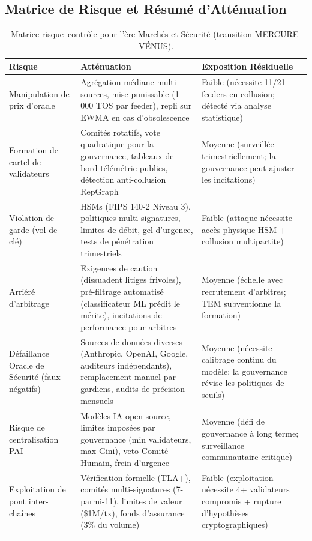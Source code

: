 \documentclass[11pt]{article}
\begin{document}
\subsection{Matrice de Risque et Résumé d'Atténuation}
\begin{longtable}{@{}p{}p{}p{}@{}}
\toprule
\textbf{Risque} & \textbf{Atténuation} & \textbf{Exposition Résiduelle} \\\midrule
Manipulation de prix d'oracle & Agrégation médiane multi-sources, mise punissable (1 000 TOS par feeder), repli sur EWMA en cas d'obsolescence & Faible (nécessite 11/21 feeders en collusion; détecté via analyse statistique) \\
Formation de cartel de validateurs & Comités rotatifs, vote quadratique pour la gouvernance, tableaux de bord télémétrie publics, détection anti-collusion RepGraph & Moyenne (surveillée trimestriellement; la gouvernance peut ajuster les incitations) \\
Violation de garde (vol de clé) & HSMs (FIPS 140-2 Niveau 3), politiques multi-signatures, limites de débit, gel d'urgence, tests de pénétration trimestriels & Faible (attaque nécessite accès physique HSM + collusion multipartite) \\
Arriéré d'arbitrage & Exigences de caution (dissuadent litiges frivoles), pré-filtrage automatisé (classificateur ML prédit le mérite), incitations de performance pour arbitres & Moyenne (échelle avec recrutement d'arbitres; TEM subventionne la formation) \\
Défaillance Oracle de Sécurité (faux négatifs) & Sources de données diverses (Anthropic, OpenAI, Google, auditeurs indépendants), remplacement manuel par gardiens, audits de précision mensuels & Moyenne (nécessite calibrage continu du modèle; la gouvernance révise les politiques de seuils) \\
Risque de centralisation PAI & Modèles IA open-source, limites imposées par gouvernance (min validateurs, max Gini), veto Comité Humain, frein d'urgence & Moyenne (défi de gouvernance à long terme; surveillance communautaire critique) \\
Exploitation de pont inter-chaînes & Vérification formelle (TLA+), comités multi-signatures (7-parmi-11), limites de valeur (\$1M/tx), fonds d'assurance (3\% du volume) & Faible (exploitation nécessite 4+ validateurs compromis + rupture d'hypothèses cryptographiques) \\\bottomrule
\caption{Matrice risque--contrôle pour l'ère Marchés et Sécurité (transition MERCURE-VÉNUS).}
\label{tab:risk-markets-expanded}
\end{longtable}
\end{document}
